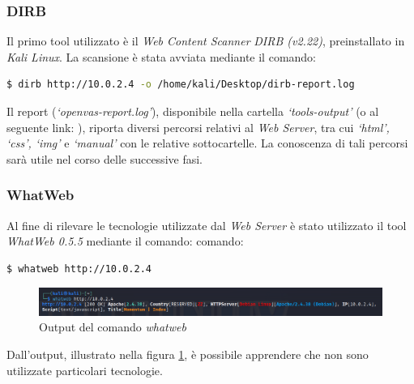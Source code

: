 \subsubsection{DIRB}
Il primo tool utilizzato è il \emph{Web Content Scanner} \emph{DIRB (v2.22)}, preinstallato in \emph{Kali Linux}. La scansione è stata avviata mediante il comando:
\begin{lstlisting}[language=bash]
    $ dirb http://10.0.2.4 -o /home/kali/Desktop/dirb-report.log 
\end{lstlisting}
Il report (\emph{`openvas-report.log'}), disponibile nella cartella \emph{`tools-output'} (o al seguente link: ), riporta diversi percorsi relativi al \emph{Web Server}, tra cui \emph{`html', `css', `img'} e \emph{`manual'} con le relative sottocartelle. La conoscenza di tali percorsi sarà utile nel corso delle successive fasi.
\subsubsection{WhatWeb}
Al fine di rilevare le tecnologie utilizzate dal \emph{Web Server} è stato utilizzato il tool \emph{WhatWeb 0.5.5} mediante il comando:
comando:
\begin{lstlisting}[language=bash]
    $ whatweb http://10.0.2.4 
\end{lstlisting}
\begin{figure}[h]
    \centering
    \includegraphics[scale=0.5]{capitoli/images/whatweb.png}
    \caption{Output del comando \emph{whatweb}}
    \label{fig:whatweb}
\end{figure}
Dall'output, illustrato nella figura \ref{fig:whatweb}, è possibile apprendere che non sono utilizzate particolari tecnologie. 
